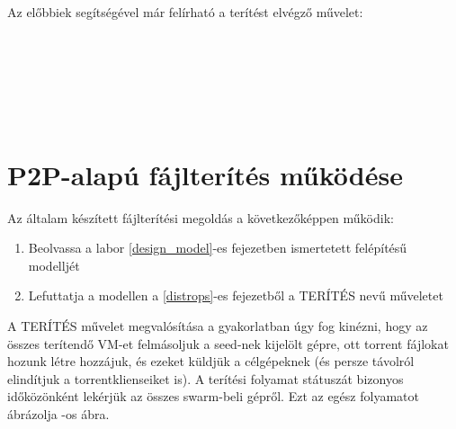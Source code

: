 Az előbbiek segítségével már felírható a terítést elvégző  művelet:\vspace{0.5cm}

\\
\indent {}\\
\indent \indent {}\\
\indent \indent \indent	{}\\
\indent \indent \indent	{}\\
\indent \indent \indent \indent	{}


\section{P2P-alapú fájlterítés működése}
\label{design_apparchi}

Az általam készített fájlterítési megoldás a következőképpen működik:

\begin{enumerate}
  \item Beolvassa a labor \ref{design_model}-es fejezetben ismertetett felépítésű modelljét
  \item Lefuttatja a modellen a \ref{distrops}-es fejezetből a TERÍTÉS nevű műveletet
\end{enumerate}

A TERÍTÉS művelet megvalósítása a gyakorlatban úgy fog kinézni, hogy az összes terítendő VM-et felmásoljuk a seed-nek kijelölt gépre, ott torrent fájlokat hozunk létre hozzájuk, és ezeket küldjük a célgépeknek (és persze távolról elindítjuk a torrentklienseiket is). A terítési folyamat státuszát bizonyos időközönként lekérjük az összes swarm-beli gépről. Ezt az egész folyamatot ábrázolja -os ábra.

